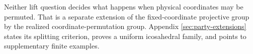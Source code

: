 \begin{remark}
Neither lift question decides what happens when physical coordinates may be
permuted.  That is a separate extension of the fixed-coordinate projective
group by the realized coordinate-permutation group.  Appendix
\ref{sec:party-extensions} states its splitting criterion, proves a uniform
icosahedral family, and points to supplementary finite examples.
\end{remark}

